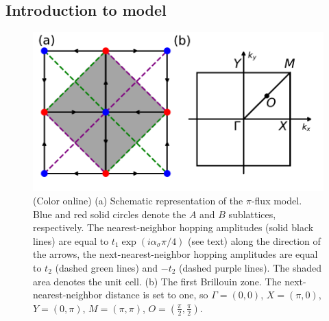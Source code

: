 \documentclass[amsmath,superscriptaddress,showpacs,aps,prb,twocolumn]{revtex4-1}
\begin{document}
\subsection{Introduction to model}\label{intro_to_model}

\begin{figure}
\includegraphics[width=\columnwidth]{lattice}
\caption{(Color online) (a) Schematic representation of the $\pi$-flux model. Blue and red solid circles denote the $A$ and $B$ sublattices, respectively. The nearest-neighbor hopping amplitudes (solid black lines) are equal to $t_{1}\exp(i\alpha_{\sigma}\pi/4)$ (see text) along the direction of the arrows, the next-nearest-neighbor hopping amplitudes are equal to $t_{2}$ (dashed green lines) and $-t_{2}$ (dashed purple lines). The shaded area denotes the unit cell. (b) The first Brillouin zone. The next-nearest-neighbor distance is set to one, so $\Gamma=(0,0)$, $X=(\pi,0)$, $Y=(0,\pi)$, $M=(\pi,\pi)$, $O=(\frac{\pi}{2},\frac{\pi}{2})$.}
\label{lattice}
\end{figure}
\end{document}
